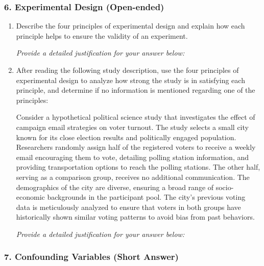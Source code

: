 \documentclass{article}
\begin{document}
\subsubsection*{6. Experimental Design (Open-ended)}
\begin{enumerate}
    \item Describe the four principles of experimental design and explain how each principle helps to ensure the validity of an experiment.
    \par \emph{Provide a detailed justification for your answer below:}
        \begin{center}
        \end{center}
    \item After reading the following study description, use the four principles of experimental design to analyze how strong the study is in satisfying each principle, and determine if no information is mentioned regarding one of the principles: 
    \par Consider a hypothetical political science study that investigates the effect of campaign email strategies on voter turnout. The study selects a small city known for its close election results and politically engaged population. Researchers randomly assign half of the registered voters to receive a weekly email encouraging them to vote, detailing polling station information, and providing transportation options to reach the polling stations. The other half, serving as a comparison group, receives no additional communication. The demographics of the city are diverse, ensuring a broad range of socio-economic backgrounds in the participant pool. The city’s previous voting data is meticulously analyzed to ensure that voters in both groups have historically shown similar voting patterns to avoid bias from past behaviors. 
    \par \emph{Provide a detailed justification for your answer below:}
    \begin{center}
    \end{center}
\end{enumerate}


\subsubsection*{7. Confounding Variables (Short Answer)}
\end{document}
